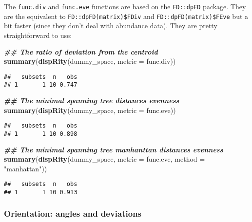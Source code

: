 \documentclass[
]{book}
\newenvironment{Shaded}{\begin{snugshade}}{\end{snugshade}}
\newcommand{\AttributeTok}[1]{\textcolor[rgb]{0.13,0.29,0.53}{#1}}
\newcommand{\DocumentationTok}[1]{\textcolor[rgb]{0.56,0.35,0.01}{\textbf{\textit{#1}}}}
\newcommand{\FunctionTok}[1]{\textcolor[rgb]{0.13,0.29,0.53}{\textbf{#1}}}
\newcommand{\NormalTok}[1]{#1}
\newcommand{\StringTok}[1]{\textcolor[rgb]{0.31,0.60,0.02}{#1}}
\begin{document}
The \texttt{func.div} and \texttt{func.eve} functions are based on the \texttt{FD::dpFD} package.
They are the equivalent to \texttt{FD::dpFD(matrix)\$FDiv} and \texttt{FD::dpFD(matrix)\$FEve} but a bit faster (since they don't deal with abundance data).
They are pretty straightforward to use:

\begin{Shaded}
\begin{Highlighting}[]
\DocumentationTok{\#\# The ratio of deviation from the centroid }
\FunctionTok{summary}\NormalTok{(}\FunctionTok{dispRity}\NormalTok{(dummy\_space, }\AttributeTok{metric =}\NormalTok{ func.div))}
\end{Highlighting}
\end{Shaded}

\begin{verbatim}
##   subsets  n   obs
## 1       1 10 0.747
\end{verbatim}

\begin{Shaded}
\begin{Highlighting}[]
\DocumentationTok{\#\# The minimal spanning tree distances evenness}
\FunctionTok{summary}\NormalTok{(}\FunctionTok{dispRity}\NormalTok{(dummy\_space, }\AttributeTok{metric =}\NormalTok{ func.eve))}
\end{Highlighting}
\end{Shaded}

\begin{verbatim}
##   subsets  n   obs
## 1       1 10 0.898
\end{verbatim}

\begin{Shaded}
\begin{Highlighting}[]
\DocumentationTok{\#\# The minimal spanning tree manhanttan distances evenness}
\FunctionTok{summary}\NormalTok{(}\FunctionTok{dispRity}\NormalTok{(dummy\_space, }\AttributeTok{metric =}\NormalTok{ func.eve,}
                 \AttributeTok{method =} \StringTok{"manhattan"}\NormalTok{))}
\end{Highlighting}
\end{Shaded}

\begin{verbatim}
##   subsets  n   obs
## 1       1 10 0.913
\end{verbatim}

\hypertarget{orientation-angles-and-deviations}{%
\subsubsection{Orientation: angles and deviations}\label{orientation-angles-and-deviations}}
\end{document}
